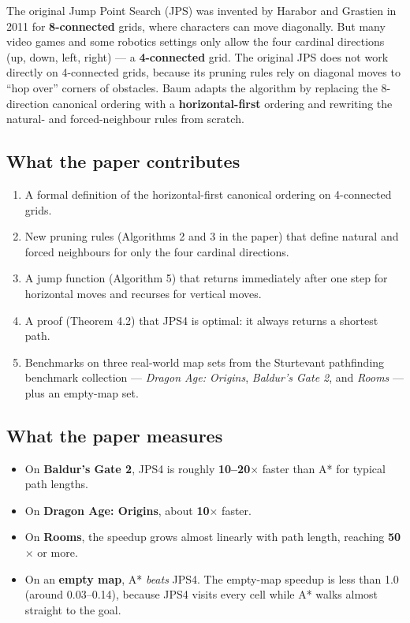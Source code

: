 \documentclass[11pt,a4paper]{article}
\begin{document}
The original Jump Point Search (JPS) was invented by Harabor and Grastien in 2011 for \textbf{8-connected} grids, where characters can move diagonally. But many video games and some robotics settings only allow the four cardinal directions (up, down, left, right) --- a \textbf{4-connected} grid. The original JPS does not work directly on 4-connected grids, because its pruning rules rely on diagonal moves to ``hop over'' corners of obstacles. Baum adapts the algorithm by replacing the 8-direction canonical ordering with a \textbf{horizontal-first} ordering and rewriting the natural- and forced-neighbour rules from scratch.

\subsection{What the paper contributes}

\begin{enumerate}[leftmargin=20pt,itemsep=2pt]
  \item A formal definition of the horizontal-first canonical ordering on 4-connected grids.
  \item New pruning rules (Algorithms 2 and 3 in the paper) that define natural and forced neighbours for only the four cardinal directions.
  \item A jump function (Algorithm 5) that returns immediately after one step for horizontal moves and recurses for vertical moves.
  \item A proof (Theorem 4.2) that JPS4 is optimal: it always returns a shortest path.
  \item Benchmarks on three real-world map sets from the Sturtevant pathfinding benchmark collection --- \textit{Dragon Age: Origins}, \textit{Baldur's Gate 2}, and \textit{Rooms} --- plus an empty-map set.
\end{enumerate}

\subsection{What the paper measures}

\begin{itemize}[leftmargin=20pt,itemsep=2pt]
  \item On \textbf{Baldur's Gate 2}, JPS4 is roughly \textbf{10--20$\times$} faster than A* for typical path lengths.
  \item On \textbf{Dragon Age: Origins}, about \textbf{10$\times$} faster.
  \item On \textbf{Rooms}, the speedup grows almost linearly with path length, reaching \textbf{50$\times$} or more.
  \item On an \textbf{empty map}, A* \emph{beats} JPS4. The empty-map speedup is less than 1.0 (around 0.03--0.14), because JPS4 visits every cell while A* walks almost straight to the goal.
\end{itemize}
\end{document}
